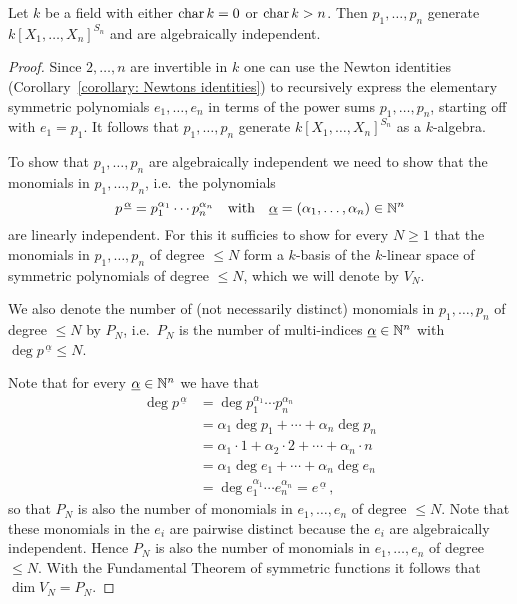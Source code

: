\begin{theorem}
  Let $k$ be a field with either $\operatorname{char} k = 0$ or $\operatorname{char} k > n$.
  Then $p_1, \dotsc, p_n$ generate $k[X_1, \dotsc, X_n]^{S_n}$ and are algebraically independent.
\end{theorem}
\begin{proof}
  Since $2, \dotsc, n$ are invertible in $k$ one can use the Newton identities (Corollary~\ref{corollary: Newtons identities}) to recursively express the elementary symmetric polynomials $e_1, \dotsc, e_n$ in terms of the power sums $p_1, \dotsc, p_n$, starting off with $e_1 = p_1$.
  It follows that $p_1, \dotsc, p_n$ generate $k[X_1, \dotsc, X_n]^{S_n}$ as a $k$-algebra.
  
  To show that $p_1, \dotsc, p_n$ are algebraically independent we need to show that the monomials in $p_1, \dotsc, p_n$, i.e.\ the polynomials
  \[
      p^{\,\underline{\alpha}}
    = p_1^{\alpha_1} \dotsm p_n^{\alpha_n}
    \quad\text{with}\quad
        \underline{\alpha}
    =   (\alpha_1, \dotsc, \alpha_n)
    \in \mathbb{N}^n
  \]
  are linearly independent.
  For this it sufficies to show for every $N \geq 1$ that the monomials in $p_1, \dotsc, p_n$ of degree $\leq N$ form a $k$-basis of the $k$-linear space of symmetric polynomials of degree $\leq N$, which we will denote by $V_N$.
  
  We also denote the number of (not necessarily distinct) monomials in $p_1, \dotsc, p_n$ of degree $\leq N$ by $P_N$, i.e.\ $P_N$ is the number of multi-indices $\underline{\alpha} \in \mathbb{N}^n$ with $\deg p^{\,\underline{\alpha}} \leq N$.
  
  Note that for every $\underline{\alpha} \in \mathbb{N}^n$ we have that
  \begin{align*}
        \deg p^{\,\underline{\alpha}}
    &=  \deg
        p_1^{\alpha_1}
        \dotsm 
        p_n^{\alpha_n} \\
    &=    \alpha_1 \deg p_1
        + \dotsb 
        + \alpha_n \deg p_n \\
    &=    \alpha_1 \cdot 1
        + \alpha_2 \cdot 2
        + \dotsb
        + \alpha_n \cdot n  \\
    &=    \alpha_1 \deg e_1
        + \dotsb 
        + \alpha_n \deg e_n \\
    &=  \deg
        e_1^{\alpha_1}
        \dotsm 
        e_n^{\alpha_n}
     =  e^{\,\underline{\alpha}} \,,
  \end{align*}
  so that $P_N$ is also the number of monomials in $e_1, \dotsc, e_n$ of degree $\leq N$.
  Note that these monomials in the $e_i$ are pairwise distinct because the $e_i$ are algebraically independent.
  Hence $P_N$ is also the number of monomials in $e_1, \dotsc, e_n$ of degree $\leq N$.
  With the Fundamental Theorem of symmetric functions it follows that $\dim V_N = P_N$.
  

\end{proof}
